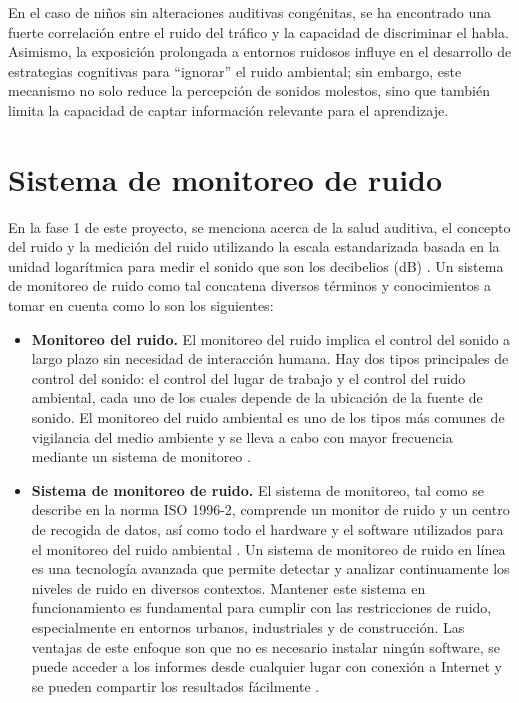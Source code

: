 {{En el caso de niños sin alteraciones auditivas congénitas, se ha encontrado una fuerte correlación entre el ruido del tráfico y la capacidad de discriminar el habla. Asimismo, la exposición prolongada a entornos ruidosos influye en el desarrollo de estrategias cognitivas para “ignorar” el ruido ambiental; sin embargo, este mecanismo no solo reduce la percepción de sonidos molestos, sino que también limita la capacidad de captar información relevante para el aprendizaje.

\section{Sistema de monitoreo de ruido}
En la fase 1 de este proyecto, se menciona acerca de la salud auditiva, el concepto del ruido y la medición del ruido utilizando la escala estandarizada basada en la unidad logarítmica para medir el sonido que son los decibelios (dB) \parencite{carpio2025}. Un sistema de monitoreo de ruido como tal concatena diversos términos y conocimientos a tomar en cuenta como lo son los siguientes: 

\begin{itemize}\setlength{\itemsep}{0.8em}

    \item \textbf{Monitoreo del ruido.} El monitoreo del ruido implica el control del sonido a largo plazo sin necesidad de interacción humana. Hay dos tipos principales de control del sonido: el control del lugar de trabajo y el control del ruido ambiental, cada uno de los cuales depende de la ubicación de la fuente de sonido. El monitoreo del ruido ambiental es uno de los tipos más comunes de vigilancia del medio ambiente y se lleva a cabo con mayor frecuencia mediante un sistema de monitoreo \parencite{Svantek2025MonitoreoDelRuido}.

    \item \textbf{Sistema de monitoreo de ruido.} El sistema de monitoreo, tal como se describe en la norma ISO 1996-2, comprende un monitor de ruido y un centro de recogida de datos, así como todo el hardware y el software utilizados para el monitoreo del ruido ambiental \parencite{Svantek2025MonitoreoDelRuido}. Un sistema de monitoreo de ruido en línea es una tecnología avanzada que permite detectar y analizar continuamente los niveles de ruido en diversos contextos. Mantener este sistema en funcionamiento es fundamental para cumplir con las restricciones de ruido, especialmente en entornos urbanos, industriales y de construcción. Las ventajas de este enfoque son que no es necesario instalar ningún software, se puede acceder a los informes desde cualquier lugar con conexión a Internet y se pueden compartir los resultados fácilmente \parencite{AdvanceTech2024}.


\end{itemize}}}
